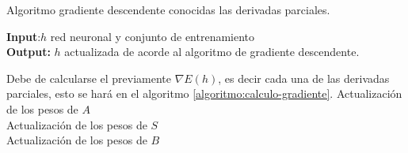 \begin{algorithm}[H]
    \caption{Algoritmo gradiente descendente conocidas las derivadas parciales.}
    \hspace*{\algorithmicindent} \textbf{Input}:$h$ red neuronal  y conjunto de entrenamiento \\
    \hspace*{\algorithmicindent} \textbf{Output:} $h$ actualizada de acorde al algoritmo de gradiente descendente. 
    \begin{algorithmic}[1]
        \STATE Debe de calcularse el previamente $\nabla E(h)$, es decir cada una de las derivadas parciales, esto se hará en el algoritmo \ref{algoritmo:calculo-gradiente}.
        \STATE Actualización de los pesos de $A$ \\  
        \STATE Actualización de los pesos de $S$ \\   
        \STATE Actualización de los pesos de $B$ \\ 
\end{algorithmic}
\end{algorithm}

